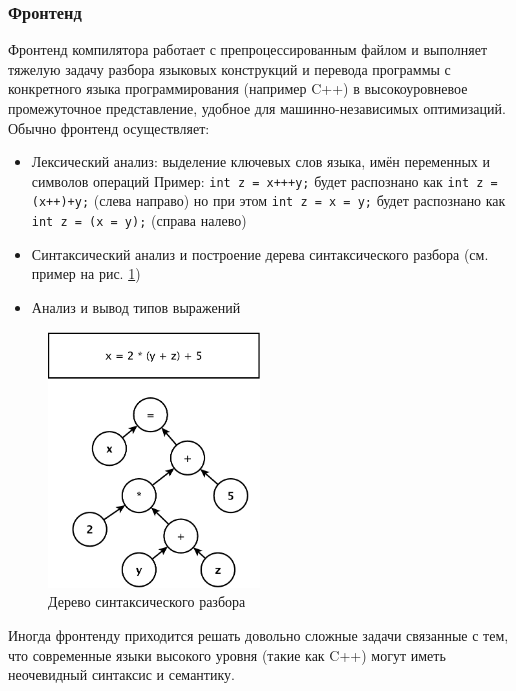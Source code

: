 \documentclass[a4paper,12pt,oneside]{article}
\begin{document}
\subsubsection{Фронтенд}\label{subsubsec:Frontend}

Фронтенд компилятора работает с препроцессированным файлом и выполняет тяжелую задачу разбора языковых конструкций и перевода программы с конкретного языка программирования (например C++) в высокоуровневое промежуточное представление, удобное для машинно-независимых оптимизаций. Обычно фронтенд осуществляет:

\begin{itemize}
\item Лексический анализ: выделение ключевых слов языка, имён переменных и символов операций
Пример: \lstinline!int z = x+++y;! будет распознано как \lstinline!int z = (x++)+y;! (слева направо) но при этом \lstinline!int z = x = y;! будет распознано как \lstinline!int z = (x = y);! (справа налево)
\item Синтаксический анализ и построение дерева синтаксического разбора (см. пример на рис. \ref{fig:ast_scheme})
\item Анализ и вывод типов выражений
\end{itemize}

\begin{figure}[ht]
\centering
\includegraphics[width=0.5\textwidth]{illustrations/ast-example-crop.pdf}
\caption{Дерево синтаксического разбора}
\label{fig:ast_scheme}
\end{figure}

Иногда фронтенду приходится решать довольно сложные задачи связанные с тем, что современные языки высокого уровня (такие как C++) могут иметь неочевидный синтаксис и семантику.
\end{document}
